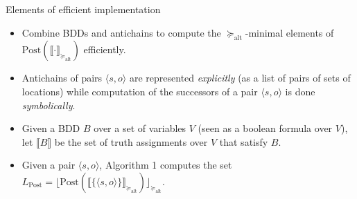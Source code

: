 \documentclass[12pt]{beamer}
\begin{document}
\begin{frame}{Elements of efficient implementation}
	\begin{itemize}
		\item Combine BDDs and antichains to compute the $\succeq_{\text{alt}}$-minimal elements of $\text{Post}(\llbracket \cdot \rrbracket_{\succeq_{\text{alt}}})$ efficiently.
		\item Antichains of pairs $\langle s, o \rangle$ are represented \textit{explicitly} (as a list of pairs of sets
		of locations) while computation of the successors of a pair $\langle s, o \rangle$ is done \textit{symbolically}.
		\item Given a BDD $B$ over a set of variables $V$ (seen as a boolean formula over $V$), let $\llbracket B \rrbracket$ be the set of truth assignments over $V$ that satisfy $B$.
		\item Given a pair $\langle s, o \rangle$, Algorithm 1 computes the set $L_{\text{Post}} = \lfloor \text{Post}(\llbracket \{\langle s, o \rangle\}\rrbracket_{\succeq_{\text{alt}}})\rfloor_{\succeq_{\text{alt}}}$.
	\end{itemize}
\end{frame}
\end{document}
